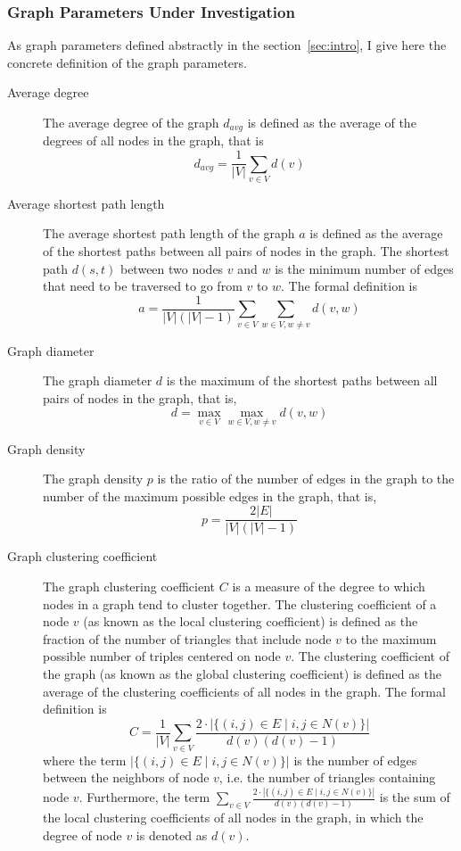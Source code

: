 \documentclass{article}
\begin{document}
\subsubsection{Graph Parameters Under Investigation} \label{sec:graph_parameters}
As graph parameters defined abstractly in the section~\ref{sec:intro}, I give here the concrete definition of the graph parameters.

\begin{description}
    \item [Average degree] The average degree of the graph $d_{avg}$ is defined as the average of the degrees of all nodes in the graph, that is
    $$ d_{avg} = \frac{1}{|V|} \sum_{v \in V} d(v)$$
    \item [Average shortest path length] The average shortest path length of the graph $a$ is defined as the average of the shortest paths between all pairs of nodes in the graph. The shortest path $d(s, t)$ between two nodes $v$ and $w$ is the minimum number of edges that need to be traversed to go from $v$ to $w$. The formal definition is
    $$
a = \frac{1}{|V|(|V|-1)} \sum_{v \in V} \sum_{w \in V, w \neq v} d(v, w)
    $$

    \item [Graph diameter] The graph diameter $d$ is the maximum of the shortest paths between all pairs of nodes in the graph, that is,
    $$
d = \max_{v \in V} \max_{w \in V, w \neq v} d(v, w)
    $$

    \item [Graph density] The graph density $p$ is the ratio of the number of edges in the graph to the number of the maximum possible edges in the graph, that is,
    $$
p = \frac{2|E|}{|V|(|V|-1)}
    $$
    
    \item [Graph clustering coefficient] The graph clustering coefficient $C$ is a measure of the degree to which nodes in a graph tend to cluster together. The clustering coefficient of a node $v$ (as known as the local clustering coefficient) is defined as the fraction of the number of triangles that include node $v$ to the maximum possible number of triples centered on node $v$. The clustering coefficient of the graph (as known as the global clustering coefficient) is defined as the average of the clustering coefficients of all nodes in the graph. The formal definition is
    $$
C = \frac{1}{|V|} \sum_{v \in V} \frac{2\cdot |\{(i,j)\in E \mid i, j \in N(v)\}|}{d(v)(d(v)-1)}
    $$
    where the term $|\{(i,j)\in E \mid i, j \in N(v)\}|$ is the number of edges between the neighbors of node $v$, i.e. the number of triangles containing node $v$. Furthermore, the term $\sum_{v \in V} \frac{2\cdot |\{(i,j)\in E \mid i, j \in N(v)\}|}{d(v)(d(v)-1)}$ is the sum of the local clustering coefficients of all nodes in the graph, in which the degree of node $v$ is denoted as $d(v)$.


\end{description}
\end{document}
